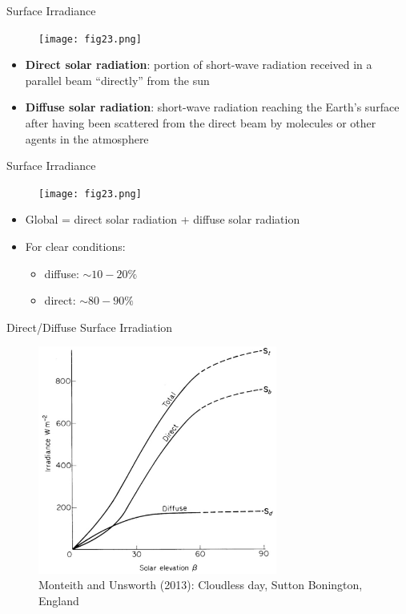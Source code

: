 
\begin{frame}{Surface Irradiance}
\begin{figure}
	\texttt{[image: fig23.png]}
\end{figure}
\begin{itemize}
\small
	\item \textbf{Direct solar radiation}: portion of short-wave radiation received in a parallel beam ``directly'' from the sun
	\item \textbf{Diffuse solar radiation}: short-wave radiation reaching the Earth's surface after having been scattered from the direct beam by molecules or other agents in the atmosphere
\end{itemize}

\end{frame}


\begin{frame}{Surface Irradiance}
\begin{figure}
	\texttt{[image: fig23.png]}
\end{figure}
\begin{itemize}
\small
	\item Global = direct solar radiation + diffuse solar radiation
	\item For clear conditions:
	\begin{itemize}
	\item diffuse: $\sim 10-20\%$
	\item direct: $\sim 80-90\%$
	\end{itemize}
\end{itemize}

\end{frame}


\begin{frame}{Direct/Diffuse Surface Irradiation}
\begin{figure}
	\includegraphics[width=0.7\textwidth]{fig25.png}
	\centering \tiny~\\Monteith and Unsworth (2013):
	\centering Cloudless day, Sutton Bonington, England
\end{figure}
\end{frame}

